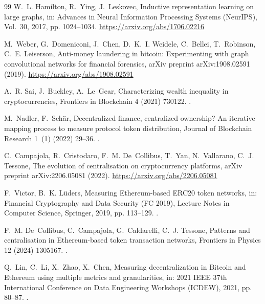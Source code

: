 \begin{thebibliography}{99}
W.~L. Hamilton, R.~Ying, J.~Leskovec, Inductive representation learning on
large graphs, in: Advances in Neural Information Processing Systems
(NeurIPS), Vol.~30, 2017, pp. 1024--1034.
\newline\urlprefix\url{https://arxiv.org/abs/1706.02216}

M.~Weber, G.~Domeniconi, J.~Chen, D.~K.~I. Weidele, C.~Bellei, T.~Robinson,
C.~E. Leiserson, Anti-money laundering in bitcoin: Experimenting with graph
convolutional networks for financial forensics, arXiv preprint
arXiv:1908.02591 (2019).
\newline\urlprefix\url{https://arxiv.org/abs/1908.02591}

A.~R. Sai, J.~Buckley, A.~Le~Gear, Characterizing wealth inequality in
cryptocurrencies, Frontiers in Blockchain 4 (2021) 730122.
\newblock \href{https://doi.org/10.3389/fbloc.2021.730122}{}.

M.~Nadler, F.~Sch{\"a}r, Decentralized finance, centralized ownership? An
iterative mapping process to measure protocol token distribution, Journal of
Blockchain Research 1~(1) (2022) 29--36.
\newblock \href{https://doi.org/10.4310/JBR.2022.v1.n1.a3}{}.

C.~Campajola, R.~Cristodaro, F.~M. De~Collibus, T.~Yan, N.~Vallarano, C.~J.
Tessone, The evolution of centralisation on cryptocurrency platforms, arXiv
preprint arXiv:2206.05081 (2022).
\newline\urlprefix\url{https://arxiv.org/abs/2206.05081}

F.~Victor, B.~K. L{\"u}ders, Measuring {Ethereum}-based {ERC20} token
networks, in: Financial Cryptography and Data Security (FC 2019), Lecture
Notes in Computer Science, Springer, 2019, pp. 113--129.
\newblock \href{https://doi.org/10.1007/978-3-030-32101-7_8}{}.

F.~M. De~Collibus, C.~Campajola, G.~Caldarelli, C.~J. Tessone, Patterns and
centralisation in {Ethereum}-based token transaction networks, Frontiers in
Physics 12 (2024) 1305167.
\newblock \href{https://doi.org/10.3389/fphy.2024.1305167}{}.

Q.~Lin, C.~Li, X.~Zhao, X.~Chen, Measuring decentralization in {Bitcoin} and
{Ethereum} using multiple metrics and granularities, in: 2021 IEEE 37th
International Conference on Data Engineering Workshops (ICDEW), 2021, pp.
80--87.
\newblock \href{https://doi.org/10.1109/ICDEW53142.2021.00022}{}.


\end{thebibliography}

